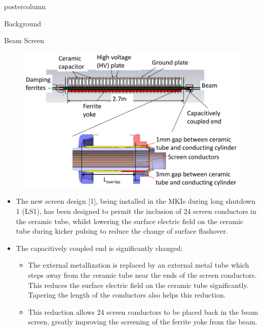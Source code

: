 \documentclass[final,hyperref={pdfpagelabels=false}]{beamer}
\begin{document}
\begin{frame}
\begin{columns}
\begin{column}{.49\textwidth}
\begin{beamercolorbox}[center,wd=\textwidth]{postercolumn}
\begin{minipage}[T]{.95\textwidth}
{\begin{block}{Background}
	\end{block}
 \vfill
	\begin{block}{Beam Screen}
\begin{figure}
\includegraphics[width=1.0\textwidth]{beamScreen.pdf}
\end{figure}
\begin{itemize}
\item{The new screen design [1], being installed  in the MKIs during long shutdown 1 (LS1), has been designed to permit the inclusion of 24 screen conductors in the ceramic tube, whilst lowering the surface electric field on the ceramic tube during kicker pulsing to reduce the change of surface flashover.}
\item{The capacitively coupled end is significantly changed:}
\begin{itemize}
\item{The external metallization is replaced by an external metal tube which steps away from the ceramic tube near the ends of the screen conductors. This reduces the surface electric field on the ceramic tube significantly. Tapering the length of the conductors also helps this reduction.}
\item{This reduction allows 24 screen conductors to be placed back in the beam screen, greatly improving the screening of the ferrite yoke from the beam.}
\end{itemize}
\end{itemize}

	\end{block}

            \vfill

}
\end{minipage}
\end{beamercolorbox}
\end{column}
\end{columns}
\end{frame}
\end{document}
